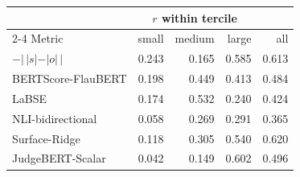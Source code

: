 \setlength{\tabcolsep}{4pt}
\begin{tabular}{lrrrr}
\toprule
& \multicolumn{3}{c}{$r$ within tercile} & \\
\cmidrule(lr){2-4}
Metric & small & medium & large & all \\
\midrule
$-|\,|s|-|o|\,|$ & 0.243 & 0.165 & 0.585 & 0.613 \\
BERTScore-FlauBERT & 0.198 & 0.449 & 0.413 & 0.484 \\
LaBSE & 0.174 & 0.532 & 0.240 & 0.424 \\
NLI-bidirectional & 0.058 & 0.269 & 0.291 & 0.365 \\
Surface-Ridge & 0.118 & 0.305 & 0.540 & 0.620 \\
JudgeBERT-Scalar & 0.042 & 0.149 & 0.602 & 0.496 \\
\bottomrule
\end{tabular}